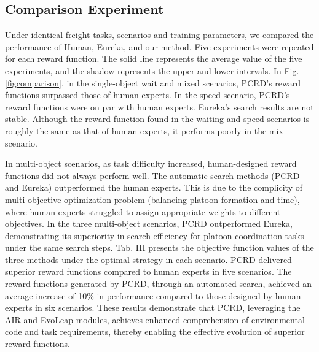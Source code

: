 \documentclass[lettersize,journal]{IEEEtran}
\begin{document}
\subsection{Comparison Experiment}
Under identical freight tasks, scenarios and training parameters, we compared the performance of Human, Eureka, and our method. 
Five experiments were repeated for each reward function. 
The solid line represents the average value of the five experiments, and the shadow represents the upper and lower intervals.
In Fig. \ref{figcomparison}, in the single-object wait and mixed scenarios, PCRD's reward functions surpassed those of human experts. 
In the speed scenario, PCRD's reward functions were on par with human experts.
Eureka's search results are not stable. 
Although the reward function found in the waiting and speed scenarios is roughly the same as that of human experts, it performs poorly in the mix scenario.

In multi-object scenarios, as task difficulty increased, human-designed reward functions did not always perform well. 
The automatic search methods (PCRD and Eureka) outperformed the human experts. 
This is due to the complicity of multi-objective optimization problem (balancing platoon formation and time), where human experts struggled to assign appropriate weights to different objectives. 
In the three multi-object scenarios, PCRD outperformed Eureka, demonstrating its superiority in search efficiency for platoon coordination tasks under the same search steps.
Tab. III presents the objective function values of the three methods under the optimal strategy in each scenario. 
PCRD delivered superior reward functions compared to human experts in five scenarios. 
The reward functions generated by PCRD, through an automated search, achieved an average increase of 10\% in performance compared to those designed by human experts in six scenarios.
These results demonstrate that PCRD, leveraging the AIR and EvoLeap modules, achieves enhanced comprehension of environmental code and task requirements, thereby enabling the effective evolution of superior reward functions.
\end{document}
